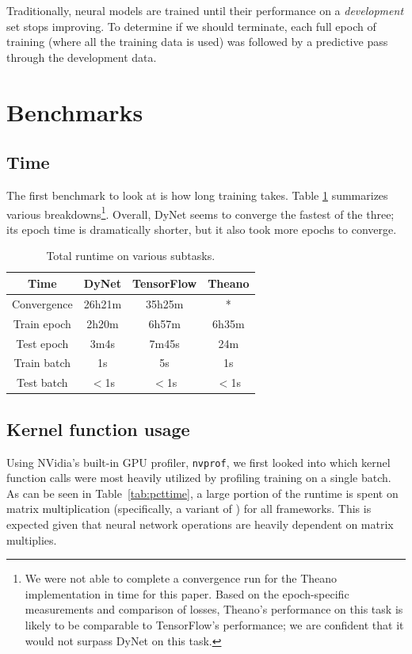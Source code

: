 \documentclass{article}
\begin{document}
Traditionally, neural models are trained until their performance on a \textit{development} set stops improving. To determine if we should terminate, each full epoch of training (where all the training data is used) was followed by a predictive pass through the development data.

\section{Benchmarks}
\label{sec:benchmarks}
\subsection{Time}
The first benchmark to look at is how long training takes. Table \ref{tab:timing} summarizes various breakdowns\footnote{We were not able to complete a convergence run for the Theano implementation in time for this paper. Based on the epoch-specific measurements and comparison of losses, Theano's performance on this task is likely to be comparable to TensorFlow's performance; we are confident that it would not surpass DyNet on this task.}. Overall, DyNet seems to converge the fastest of the three; its epoch time is dramatically shorter, but it also took more epochs to converge.

\begin{table}
\begin{tabular}{c|ccc}
Time					& DyNet 		& TensorFlow 	& Theano \\ \hline
Convergence		& 26h21m 		& 35h25m 			& * \\
Train epoch 		& 2h20m		& 6h57m 			& 6h35m \\
Test epoch 		& 3m4s			& 7m45s 			& 24m \\
Train batch 		& 1s 				& 5s 					& 1s \\
Test batch 			& $<$1s 		& $<$1s 			& $<$1s \\
\end{tabular}
\caption{\label{tab:timing}Total runtime on various subtasks.}
\end{table}

\subsection{Kernel function usage}
\label{subsec:kfunc}
Using NVidia's built-in GPU profiler, \verb!nvprof!, we first looked into which kernel function calls were most heavily utilized by profiling training on a single batch. As can be seen in Table~\ref{tab:pcttime}, a large portion of the runtime is spent on matrix multiplication (specifically, a variant of \texttt{}) for all frameworks. This is expected given that neural network operations are heavily dependent on matrix multiplies.
\end{document}
